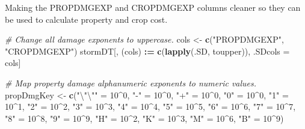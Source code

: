 \documentclass[
]{article}
\newenvironment{Shaded}{\begin{snugshade}}{\end{snugshade}}
\newcommand{\CharTok}[1]{\textcolor[rgb]{0.31,0.60,0.02}{#1}}
\newcommand{\CommentTok}[1]{\textcolor[rgb]{0.56,0.35,0.01}{\textit{#1}}}
\newcommand{\DecValTok}[1]{\textcolor[rgb]{0.00,0.00,0.81}{#1}}
\newcommand{\ErrorTok}[1]{\textcolor[rgb]{0.64,0.00,0.00}{\textbf{#1}}}
\newcommand{\KeywordTok}[1]{\textcolor[rgb]{0.13,0.29,0.53}{\textbf{#1}}}
\newcommand{\NormalTok}[1]{#1}
\newcommand{\OperatorTok}[1]{\textcolor[rgb]{0.81,0.36,0.00}{\textbf{#1}}}
\newcommand{\StringTok}[1]{\textcolor[rgb]{0.31,0.60,0.02}{#1}}
\begin{document}
Making the PROPDMGEXP and CROPDMGEXP columns cleaner so they can be used
to calculate property and crop cost.

\begin{Shaded}
\begin{Highlighting}[]
\CommentTok{# Change all damage exponents to uppercase.}
\NormalTok{cols <-}\StringTok{ }\KeywordTok{c}\NormalTok{(}\StringTok{"PROPDMGEXP"}\NormalTok{, }\StringTok{"CROPDMGEXP"}\NormalTok{)}
\NormalTok{stormDT[,  (cols) }\OperatorTok{:}\ErrorTok{=}\StringTok{ }\KeywordTok{c}\NormalTok{(}\KeywordTok{lapply}\NormalTok{(.SD, toupper)), .SDcols =}\StringTok{ }\NormalTok{cols]}

\CommentTok{# Map property damage alphanumeric exponents to numeric values.}
\NormalTok{propDmgKey <-}\StringTok{  }\KeywordTok{c}\NormalTok{(}\StringTok{"}\CharTok{\textbackslash{}"\textbackslash{}"}\StringTok{"}\NormalTok{ =}\StringTok{ }\DecValTok{10}\OperatorTok{^}\DecValTok{0}\NormalTok{,}
                 \StringTok{"-"}\NormalTok{ =}\StringTok{ }\DecValTok{10}\OperatorTok{^}\DecValTok{0}\NormalTok{, }
                 \StringTok{"+"}\NormalTok{ =}\StringTok{ }\DecValTok{10}\OperatorTok{^}\DecValTok{0}\NormalTok{,}
                 \StringTok{"0"}\NormalTok{ =}\StringTok{ }\DecValTok{10}\OperatorTok{^}\DecValTok{0}\NormalTok{,}
                 \StringTok{"1"}\NormalTok{ =}\StringTok{ }\DecValTok{10}\OperatorTok{^}\DecValTok{1}\NormalTok{,}
                 \StringTok{"2"}\NormalTok{ =}\StringTok{ }\DecValTok{10}\OperatorTok{^}\DecValTok{2}\NormalTok{,}
                 \StringTok{"3"}\NormalTok{ =}\StringTok{ }\DecValTok{10}\OperatorTok{^}\DecValTok{3}\NormalTok{,}
                 \StringTok{"4"}\NormalTok{ =}\StringTok{ }\DecValTok{10}\OperatorTok{^}\DecValTok{4}\NormalTok{,}
                 \StringTok{"5"}\NormalTok{ =}\StringTok{ }\DecValTok{10}\OperatorTok{^}\DecValTok{5}\NormalTok{,}
                 \StringTok{"6"}\NormalTok{ =}\StringTok{ }\DecValTok{10}\OperatorTok{^}\DecValTok{6}\NormalTok{,}
                 \StringTok{"7"}\NormalTok{ =}\StringTok{ }\DecValTok{10}\OperatorTok{^}\DecValTok{7}\NormalTok{,}
                 \StringTok{"8"}\NormalTok{ =}\StringTok{ }\DecValTok{10}\OperatorTok{^}\DecValTok{8}\NormalTok{,}
                 \StringTok{"9"}\NormalTok{ =}\StringTok{ }\DecValTok{10}\OperatorTok{^}\DecValTok{9}\NormalTok{,}
                 \StringTok{"H"}\NormalTok{ =}\StringTok{ }\DecValTok{10}\OperatorTok{^}\DecValTok{2}\NormalTok{,}
                 \StringTok{"K"}\NormalTok{ =}\StringTok{ }\DecValTok{10}\OperatorTok{^}\DecValTok{3}\NormalTok{,}
                 \StringTok{"M"}\NormalTok{ =}\StringTok{ }\DecValTok{10}\OperatorTok{^}\DecValTok{6}\NormalTok{,}
                 \StringTok{"B"}\NormalTok{ =}\StringTok{ }\DecValTok{10}\OperatorTok{^}\DecValTok{9}\NormalTok{)}


\end{Highlighting}
\end{Shaded}
\end{document}
